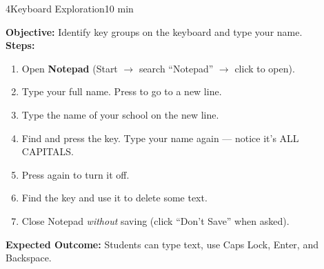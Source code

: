 
\begin{labactivity}{4}{Keyboard Exploration}{10 min}


\textbf{Objective:} Identify key groups on the keyboard and type your name.\\[4pt]
\textbf{Steps:}
\begin{enumerate}[label=\protect\stepcircle{\arabic*}, leftmargin=2cm, itemsep=4pt]
  \item Open \textbf{Notepad} (Start $\rightarrow$ search ``Notepad'' $\rightarrow$ click to open).
  \item Type your full name. Press  to go to a new line.
  \item Type the name of your school on the new line.
  \item Find and press the  key. Type your name again --- notice it's ALL CAPITALS.
  \item Press  again to turn it off.
  \item Find the  key and use it to delete some text.
  \item Close Notepad \emph{without} saving (click ``Don't Save'' when asked).
\end{enumerate}
\textbf{Expected Outcome:} Students can type text, use Caps Lock, Enter, and Backspace.

\welldone
\end{labactivity}



